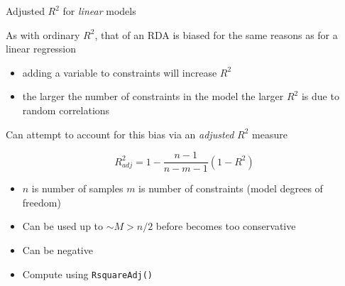 \documentclass[10pt,ignorenonframetext,compress, aspectratio=169]{beamer}
\begin{document}
\begin{frame}{Adjusted $R^2$ for \emph{linear} models}

As with ordinary $R^2$, that of an RDA is biased for the same reasons as
for a linear regression

\begin{itemize}
\itemsep1pt\parskip0pt
\item
  adding a variable to constraints will increase $R^2$
\item
  the larger the number of constraints in the model the larger $R^2$ is
  due to random correlations
\end{itemize}

Can attempt to account for this bias via an \emph{adjusted} $R^2$
measure

\[R^2_{adj} = 1 - \frac{n - 1}{n - m - 1}(1 - R^2)\]

\begin{itemize}
\itemsep1pt\parskip0pt
\item
  $n$ is number of samples $m$ is number of constraints (model degrees
  of freedom)
\item
  Can be used up to $\sim M > n/2$ before becomes too conservative
\item
  Can be negative
\item
  Compute using \texttt{RsquareAdj()}
\end{itemize}

\end{frame}
\end{document}
